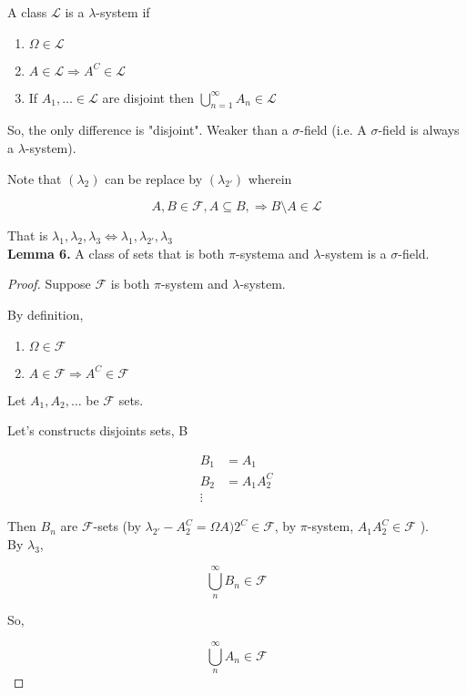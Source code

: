 \documentclass[11pt,fleqn]{book} %
\begin{document}
\begin{definition}
	A class $\mathcal{L}$ is a $\lambda$-system if 
		\begin{enumerate}[label = $\lambda$(\roman*)]
			\item $\Omega \in \mathcal{L}$ 
			\item $A \in \mathcal{L} \Rightarrow A^C \in \mathcal{L}$
			\item If $A_1, \dots \in \mathcal{L} $ are disjoint then $\bigcup^\infty_{n=1} A_n \in \mathcal{L}$
		\end{enumerate}
\end{definition}
	

	So, the only difference is "disjoint". Weaker than a $\sigma$-field (i.e. A $\sigma$-field is always a $\lambda$-system).

Note that $(\lambda_2)$ can be replace by $(\lambda_{2\prime})$ wherein

$$A, B \in \mathcal{F}, A \subseteq B, \Rightarrow B\setminus A \in \mathcal{L} $$

That is $\lambda_1, \lambda_2, \lambda_3 \Leftrightarrow \lambda_1, \lambda_{2\prime}, \lambda_3$\\

\textbf{Lemma 6.} A class of sets that is both $\pi$-systema and $\lambda$-system is a $\sigma$-field. 

\begin{proof}
	Suppose $\mathcal{F}$ is both $\pi$-system and $\lambda$-system.

By definition, 
\begin{enumerate}
			\item $\Omega \in \mathcal{F}$ 
			\item $A \in \mathcal{F} \Rightarrow A^C \in \mathcal{F}$
		\end{enumerate}

		Let $A_1, A_2, \dots$ be $\mathcal{F}$ sets. 

		Let's constructs disjoints sets, B

		\begin{align*}
			B_1 &= A_1\\
			B_2 &= A_1A_2^C\\
			\vdots
		\end{align*}

		Then $B_n$ are $\mathcal{F}$-sets (by $\lambda_{2\prime} - A_2^C = \Omega A)2^C \in \mathcal{F}$, by $\pi$-system, $A_1A_2^C \in \mathcal{F}$ ).\\

		By $\lambda_3$, 

		$$\bigcup_n^\infty B_n \in \mathcal{F} $$

		So, 

		$$\bigcup_n^\infty A_n \in \mathcal{F} $$

\end{proof}
\end{document}
